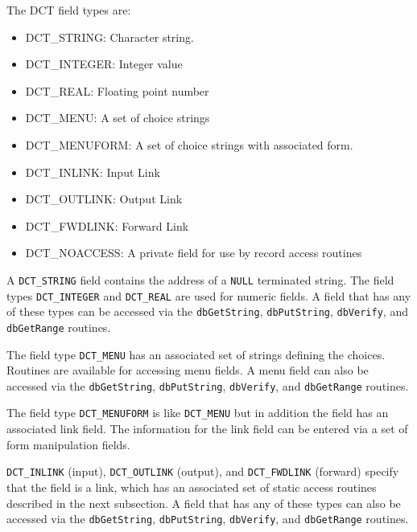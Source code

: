 The DCT field types are:

\begin{itemize}\item {}DCT\_STRING: Character string.

\item {}DCT\_INTEGER: Integer value

\item {}DCT\_REAL: Floating point number

\item {}DCT\_MENU: A set of choice strings

\item {}DCT\_MENUFORM: A set of choice strings with associated form.

\item {}DCT\_INLINK: Input Link

\item {}DCT\_OUTLINK: Output Link

\item {}DCT\_FWDLINK: Forward Link

\item {}DCT\_NOACCESS: A private field for use by record access routines

\end{itemize}A \verb|DCT_STRING| field contains the address of a \verb|NULL| terminated string. The field types \verb|DCT_INTEGER| and \verb|DCT_REAL| 
are used for numeric fields. A field that has any of these types can be accessed via the \verb|dbGetString|, \verb|dbPutString|, 
\verb|dbVerify|, and \verb|dbGetRange| routines.

The field type \verb|DCT_MENU| has an associated set of strings defining the choices. Routines are available for accessing menu 
fields. A menu field can also be accessed via the \verb|dbGetString|, \verb|dbPutString|, \verb|dbVerify|, and \verb|dbGetRange| 
routines.

The field type \verb|DCT_MENUFORM| is like \verb|DCT_MENU| but in addition the field has an associated link field. The information 
for the link field can be entered via a set of form manipulation fields.

\verb|DCT_INLINK| (input), \verb|DCT_OUTLINK| (output), and \verb|DCT_FWDLINK| (forward) specify that the field is a link, which has 
an associated set of static access routines described in the next subsection. A field that has any of these types can also be 
accessed via the \verb|dbGetString|, \verb|dbPutString|, \verb|dbVerify|, and \verb|dbGetRange| routines.

